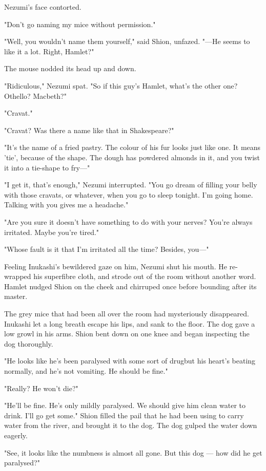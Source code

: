 Nezumi's face contorted.

"Don't go naming my mice without permission."

"Well, you wouldn't name them yourself," said Shion, unfazed. "---He seems
to like it a lot. Right, Hamlet?"

The mouse nodded its head up and down.

"Ridiculous," Nezumi spat. "So if this guy's Hamlet, what's the other
one? Othello? Macbeth?"

"Cravat."

"Cravat? Was there a name like that in Shakespeare?"

"It's the name of a fried pastry. The colour of his fur looks just like
one. It means 'tie', because of the shape. The dough has powdered
almonds in it, and you twist it into a tie-shape to fry---"

"I get it, that's enough," Nezumi interrupted. "You go dream of filling
your belly with those cravats, or whatever, when you go to sleep
tonight. I'm going home. Talking with you gives me a headache."

"Are you sure it doesn't have something to do with your nerves? You're
always irritated. Maybe you're tired."

"Whose fault is it that I'm irritated all the time? Besides, you---"

Feeling Inukashi's bewildered gaze on him, Nezumi shut his mouth. He
re-wrapped his superfibre cloth, and strode out of the room without
another word. Hamlet nudged Shion on the cheek and chirruped once before
bounding after its master.

The grey mice that had been all over the room had mysteriously
disappeared. Inukashi let a long breath escape his lips, and sank to the
floor. The dog gave a low growl in his arms. Shion bent down on one knee
and began inspecting the dog thoroughly.

"He looks like he's been paralysed with some sort of drug\el but his
heart's beating normally, and he's not vomiting. He should be fine."

"Really? He won't die?"

"He'll be fine. He's only mildly paralysed. We should give him clean
water to drink. I'll go get some." Shion filled the pail that he had
been using to carry water from the river, and brought it to the dog. The
dog gulped the water down eagerly.

"See, it looks like the numbness is almost all gone. But this dog --- how
did he get paralysed?"

